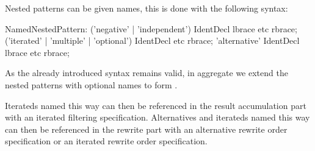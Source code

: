 Nested patterns can be given names, this is done with the following syntax: 

\begin{rail}  
  NamedNestedPattern: 
    ('negative' | 'independent') IdentDecl lbrace etc rbrace;
    ('iterated' | 'multiple' | 'optional') IdentDecl etc rbrace;
    'alternative' IdentDecl lbrace etc rbrace;
\end{rail}

As the already introduced syntax remains valid, in aggregate we extend the nested patterns with optional names to form .

Iterateds named this way can then be referenced in the result accumulation part with an iterated filtering specification.
Alternatives and iterateds named this way can then be referenced in the rewrite part with an alternative rewrite order specification or an iterated rewrite order specification.

